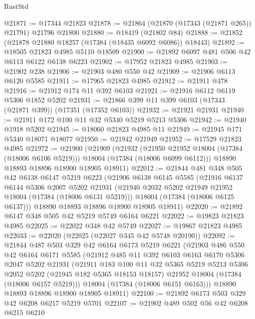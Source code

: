 \begin{lexlean}{RustStd}
\begin{coremodule}
@21871 := @17344 @21823
@21878 := @21864 (@21870 (@17343 (@21871 @265)) @21791) @21796 @21800
@21880 := @18419 (@21802 @84)
@21888 := @21852 (@21878 @21880 @18257 (@17384 (@18435 @6092 @6086)) @18443)
@21892 := @18505 @21823 @4985 @5110 @18509
@21900 := @21892 @6097 @481 @506 @42 @6113 @6122 @6138 @6223
@21902 := @17952 @21823 @4985
@21903 := @21902 @238
@21906 := @21903 @480 @550 @42
@21909 := @21906 @6113 @6120 @5585
@21911 := @17965 @21823 @4985
@21912 := @21911 @478
@21916 := @21912 @174 @11 @392 @6103
@21921 := @21916 @6112 @6119 @5306 @1852 @5202
@21931 := @21866 @399 @11 @399 @6103 (@17343 (@21871 @399)) (@17351 (@17352 @6103))
@21932 := @21921 @21931
@21940 := @21911 @172 @100 @11 @32 @5340 @5219 @5213 @5306
@21942 := @21940 @1918 @5202
@21945 := @18060 @21823 @4985 @11
@21949 := @21945 @171 @5340 @18071 @18077
@21950 := @21942 @21949
@21952 := @17529 @21823 @4985
@21972 := @21900
    (@21909
      (@21932
        (@21950 @21952 @18004 (@17384 (@18006 @6106 @5219)))
        @18004
        (@17384 (@18006 @6099 @6112)))
      @18890
      @18893
      @18896
      @18900
      @18905
      @18911)
@22012 := @21844
    @481
    @348
    @505
    @42
    @6138
    @6147
    @5219
    @6223
    (@21906
      @6138
      @6145
      @5585
      (@21916
        @6137
        @6144
        @5306
        @2007
        @5202
        @21931
        (@21940 @2032 @5202 @21949 @21952 @18004 (@17384 (@18006 @6131 @5219)))
        @18004
        (@17384 (@18006 @6125 @6137)))
      @18890
      @18893
      @18896
      @18900
      @18905
      @18911)
@22020 := @21892 @6147 @348 @505 @42 @5219 @5749 @6164 @6221
@22022 := @19823 @21823 @4985
@22025 := @22022 @348 @42 @5749
@22027 := @19867 @21823 @4985
@22033 := @22020 (@22025 (@22027 @345 @42 @5748 @20190))
@22092 := @21844
    @487
    @503
    @329
    @42
    @6164
    @6173
    @5219
    @6221
    (@21903
      @486
      @550
      @42
      @6164
      @6171
      @5585
      (@21912
        @485
        @11
        @392
        @6103
        @6163
        @6170
        @5306
        @2047
        @5202
        @21931
        (@21911
          @183
          @100
          @11
          @32
          @5365
          @5219
          @5213
          @5306
          @2052
          @5202
          (@21945 @182 @5365 @18153 @18157)
          @21952
          @18004
          (@17384 (@18006 @6157 @5219)))
        @18004
        (@17384 (@18006 @6151 @6163)))
      @18890
      @18893
      @18896
      @18900
      @18905
      @18911)
@22100 := @21892 @6173 @503 @329 @42 @6208 @6217 @5219 @5701
@22107 := @21902 @489 @502 @56 @42 @6208 @6215 @6210

\end{coremodule}
\end{lexlean}
